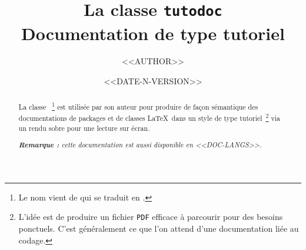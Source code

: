 \documentclass{../main/main}
\begin{document}
\title{La classe \texttt{tutodoc} \\ Documentation de type tutoriel}
\author{<<AUTHOR>>}
\date{<<DATE-N-VERSION>>}

\maketitle

\begin{abstract}
    La classe \thisproj{}\,%
    \footnote{
        Le nom vient de  qui se traduit en .
    }
    est utilisée par son auteur pour produire de façon sémantique des documentations de packages et de classes \LaTeX\ dans un style de type tutoriel\,%
    \footnote{
        L'idée est de produire un fichier \texttt{PDF} efficace à parcourir pour des besoins ponctuels. C'est généralement ce que l'on attend d'une documentation liée au codage.
    }
    via un rendu sobre pour une lecture sur écran.

    \smallskip

    \noindent
    \emph{\textbf{Remarque :} cette documentation est aussi disponible en <<DOC-LANGS>>.}
\end{abstract}
\end{document}
